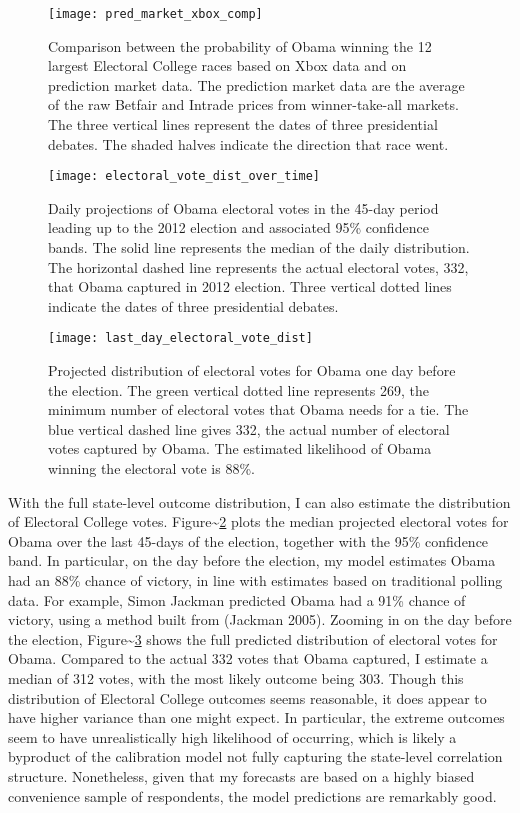 \begin{figure}[p!]
  \centering
  \texttt{[image: pred\_market\_xbox\_comp]}
  \caption{Comparison between the probability of Obama winning the 12 largest
    Electoral College races based on Xbox data and on prediction market
    data. The prediction market data are the average of the raw Betfair and Intrade
    prices from winner-take-all markets. The three vertical lines represent the
    dates of three presidential debates. The shaded halves indicate the direction
    that race went.}
  \label{fig:pm_comp}
\end{figure}

\begin{figure}[p!]
  \centering
  \texttt{[image: electoral\_vote\_dist\_over\_time]}
  \caption{Daily projections of Obama electoral votes in the 45-day period
    leading up to the 2012 election and associated 95\% confidence bands. The
    solid line represents the median of the daily distribution. The horizontal
    dashed line represents the actual electoral votes, 332, that Obama captured
    in 2012 election. Three vertical dotted lines indicate the dates of three
    presidential debates.}
  \label{fig:ev_daily}
\end{figure}

\begin{figure}[p!]
  \centering
  \texttt{[image: last\_day\_electoral\_vote\_dist]}
  \caption{Projected distribution of electoral votes for Obama one day before the election. The green vertical dotted line represents 269, the minimum number of electoral votes that Obama needs for a tie. The blue vertical dashed line gives 332, the actual number of electoral votes captured by Obama. The estimated likelihood of Obama winning the electoral vote is 88\%.}
  \label{fig:ev_lastday}
\end{figure}

With the full state-level outcome distribution, I can also estimate the
distribution of Electoral College votes.
Figure\textasciitilde{}\ref{fig:ev_daily} plots the median projected
electoral votes for Obama over the last 45-days of the election,
together with the 95\% confidence band. In particular, on the day before
the election, my model estimates Obama had an 88\% chance of victory, in
line with estimates based on traditional polling data. For example,
Simon Jackman predicted Obama had a 91\% chance of victory, using a
method built from (Jackman 2005). Zooming in on the day before the
election, Figure\textasciitilde{}\ref{fig:ev_lastday} shows the full
predicted distribution of electoral votes for Obama. Compared to the
actual 332 votes that Obama captured, I estimate a median of 312 votes,
with the most likely outcome being 303. Though this distribution of
Electoral College outcomes seems reasonable, it does appear to have
higher variance than one might expect. In particular, the extreme
outcomes seem to have unrealistically high likelihood of occurring,
which is likely a byproduct of the calibration model not fully capturing
the state-level correlation structure. Nonetheless, given that my
forecasts are based on a highly biased convenience sample of
respondents, the model predictions are remarkably good.

